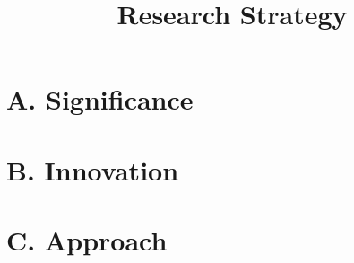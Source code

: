 \newpage
\title{Research Strategy}

\section*{A. Significance}


\section*{B. Innovation}


\section*{C. Approach}

